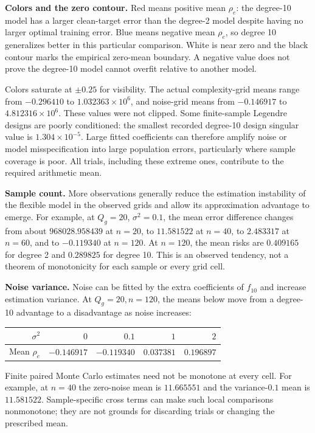 \textbf{Colors and the zero contour.} Red means positive mean $\rho_e$: the degree-10 model has a larger clean-target error than the degree-2 model despite having no larger optimal training error. Blue means negative mean $\rho_e$, so degree 10 generalizes better in this particular comparison. White is near zero and the black contour marks the empirical zero-mean boundary. A negative value does not prove the degree-10 model cannot overfit relative to another model.

Colors saturate at $\pm0.25$ for visibility. The actual complexity-grid means range from $-0.296410$ to $1.032363\times10^6$, and noise-grid means from $-0.146917$ to $4.812316\times10^6$. These values were not clipped. Some finite-sample Legendre designs are poorly conditioned: the smallest recorded degree-10 design singular value is $1.304\times10^{-5}$. Large fitted coefficients can therefore amplify noise or model misspecification into large population errors, particularly where sample coverage is poor. All trials, including these extreme ones, contribute to the required arithmetic mean.

\textbf{Sample count.} More observations generally reduce the estimation instability of the flexible model in the observed grids and allow its approximation advantage to emerge. For example, at $Q_g=20$, $\sigma^2=0.1$, the mean error difference changes from about $968028.958439$ at $n=20$, to $11.581522$ at $n=40$, to $2.483317$ at $n=60$, and to $-0.119340$ at $n=120$. At $n=120$, the mean risks are $0.409165$ for degree 2 and $0.289825$ for degree 10. This is an observed tendency, not a theorem of monotonicity for each sample or every grid cell.

\textbf{Noise variance.} Noise can be fitted by the extra coefficients of $f_{10}$ and increase estimation variance. At $Q_g=20,n=120$, the means below move from a degree-10 advantage to a disadvantage as noise increases:
\begin{center}\small
\begin{tabular}{@{}rrrrr@{}}\toprule
$\sigma^2$ & $0$ & $0.1$ & $1$ & $2$\\\midrule
Mean $\rho_e$ & $-0.146917$ & $-0.119340$ & $0.037381$ & $0.196897$\\\bottomrule
\end{tabular}\end{center}
Finite paired Monte Carlo estimates need not be monotone at every cell. For example, at $n=40$ the zero-noise mean is $11.665551$ and the variance-$0.1$ mean is $11.581522$. Sample-specific cross terms can make such local comparisons nonmonotone; they are not grounds for discarding trials or changing the prescribed mean.

